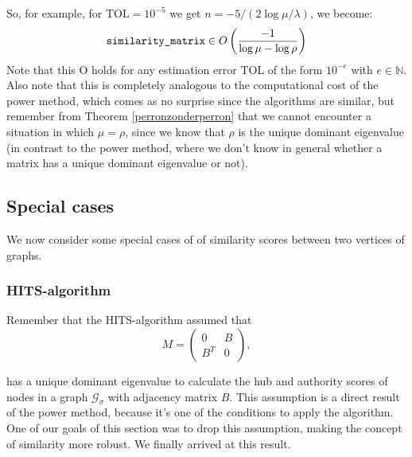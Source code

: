 \documentclass[a4paper,11pt]{report}
\newcommand{\N}{{\mathbb N}}
\newcommand{\graf}{\mathscr{G}}
\newcommand{\tol}{\text{TOL}}
\begin{document}
So, for example, for $\tol = 10^{-5}$ we get $n = -5/(2\log{\mu/\lambda})$, we become:
$$\text{\texttt{similarity\_matrix}} \in O\left(\frac{-1}{\log{\mu- \log\rho}}\right)$$
Note that this O holds for any estimation error $\tol$ of the form $10^{-e}$ with $e \in \N$. 
Also note that this is completely analogous to the computational cost of the 
power method, which comes as no surprise since the algorithms are similar, but remember 
from Theorem \ref{perronzonderperron} that we cannot encounter a situation in 
which $\mu = \rho$, since we know that $\rho$ is the unique dominant eigenvalue (in contrast to the power method, where
we don't know in general whether a matrix has a unique dominant eigenvalue or 
not).

\subsection{Special cases}
We now consider some special cases of of similarity scores between two vertices 
of graphs.
\subsubsection{HITS-algorithm}
Remember that the HITS-algorithm assumed that
$$M =  \begin{pmatrix} 
0 & B\\
B^T & 0
\end{pmatrix},$$ 

has a unique dominant eigenvalue to 
calculate the hub and authority scores of nodes in a graph $\graf_\sigma$ with adjacency matrix
$B$. This assumption is a direct result of the power method, because it's one 
of the conditions to apply the algorithm. One of our goals of this section was to drop this 
assumption, making the concept of similarity more robust. We finally arrived at 
this result.
\end{document}

